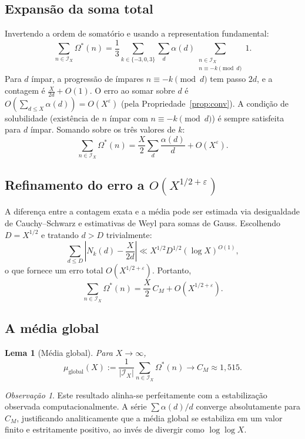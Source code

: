 \documentclass[12pt]{article}
\newtheorem{lema}[teorema]{Lema}
\theoremstyle{definition}
\theoremstyle{remark}
\newtheorem{observacao}[teorema]{Observação}
\newcommand{\Omstar}{\Omega^*}
\newcommand{\Ix}{\mathcal{I}_X}
\newcommand{\muglobal}{\mu_{\mathrm{global}}}
\begin{document}
	\subsection{Expansão da soma total}
	
	Invertendo a ordem de somatório e usando a representation fundamental:
	\[
	\sum_{n\in\Ix}\Omstar(n)
	=\frac{1}{3}\sum_{k\in\{-3,0,3\}}\sum_{d}\alpha(d)
	\sum_{\substack{n\in\Ix\\ n\equiv -k\pmod{d}}}1.
	\]
	Para $d$ ímpar, a progressão de ímpares $n\equiv -k\pmod{d}$ tem passo
	$2d$, e a contagem é $\tfrac{X}{2d}+O(1)$.
	O erro ao somar sobre $d$ é
	$O\!\left(\sum_{d\le X}\alpha(d)\right)=O(X^\varepsilon)$ (pela
	Propriedade~\ref{prop:conv}). A condição de solubilidade (existência de
	$n$ ímpar com $n\equiv -k\pmod{d}$) é sempre satisfeita para $d$ ímpar.
	Somando sobre os três valores de $k$:
	\[
	\sum_{n\in\Ix}\Omstar(n)
	=\frac{X}{2}\sum_{d}\frac{\alpha(d)}{d}+O\!\left(X^{\varepsilon}\right).
	\]
	
	\subsection{Refinamento do erro a $O(X^{1/2+\varepsilon})$}
	
	A diferença entre a contagem exata e a média pode ser estimada via
	desigualdade de Cauchy–Schwarz e estimativas de Weyl para somas de Gauss.
	Escolhendo $D=X^{1/2}$ e tratando $d>D$ trivialmente:
	\[
	\sum_{d\le D}\left|N_k(d)-\frac{X}{2d}\right|
	\ll X^{1/2}D^{1/2}(\log X)^{O(1)},
	\]
	o que fornece um erro total $O(X^{1/2+\varepsilon})$. Portanto,
	\[
	\sum_{n\in\Ix}\Omstar(n)
	=\frac{X}{2}\,C_M+O\!\left(X^{1/2+\varepsilon}\right).
	\]
	
	\subsection{A média global}
	
	\begin{lema}[Média global]\label{lem:global}
		Para $X\to\infty$,
		\[
		\boxed{\muglobal(X)
			:=\frac{1}{|\Ix|}\sum_{n\in\Ix}\Omstar(n)
			\to C_M \approx 1{,}515.}
		\]
	\end{lema}
	
	\begin{observacao}
		Este resultado alinha-se perfeitamente com a estabilização observada 
		computacionalmente.
		A série $\sum \alpha(d)/d$ converge absolutamente 
		para $C_M$, justificando analiticamente que a média global se estabiliza 
		em um valor finito e estritamente positivo, ao invés de divergir como 
		$\log\log X$.
	\end{observacao}
	
\end{document}
